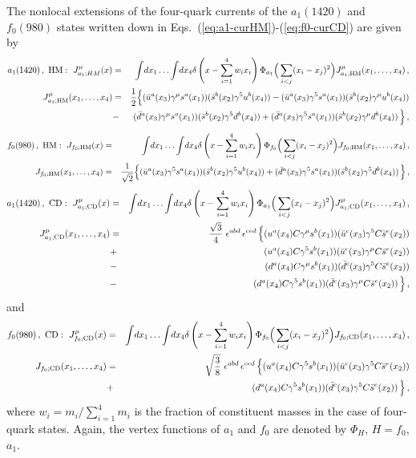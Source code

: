 \documentclass[aps,prd,floatfix,superscriptaddress,showpacs,showkeys]{revtex4}
\newcommand{\bea}{\begin{eqnarray}}
\newcommand{\ena}{\end{eqnarray}}
\begin{document}
The nonlocal extensions of the four-quark currents 
of the $a_1(1420)$ and $f_0(980)$ states written down in  
Eqs.~(\ref{eq:a1-curHM})-(\ref{eq:f0-curCD}) are given by 
%
\bea 
a_1(1420)\,, \ {\rm HM}: \ J^\mu_{a_1;HM}(x) &=& \int\! dx_1\ldots \int\! dx_4 
\delta\left(x-\sum\limits_{i=1}^4 w_i x_i\right) 
\Phi_{a_1}\Big(\sum\limits_{i<j} (x_i-x_j)^2 \Big)
J^\mu_{a_1;{\rm HM}}(x_1,\ldots,x_4)\,,
\label{eq:nonlocal-mol-cura1}\\
J^\mu_{a_1;{\rm HM}}(x_1,\ldots,x_4) &=&  \frac{1}{2} 
\Big\{
  (\bar u^a(x_3) \gamma^\mu s^a(x_1))  (\bar s^b(x_2) \gamma^5   u^b(x_4) )
- (\bar u^a(x_3) \gamma^5   s^a(x_1))  (\bar s^b(x_2) \gamma^\mu u^b(x_4) )
\nonumber\\
&-& (\bar d^a(x_3) \gamma^\mu s^a(x_1))  (\bar s^b(x_2) \gamma^5   d^b(x_4) )
  + (\bar d^a(x_3) \gamma^5   s^a(x_1))  (\bar s^b(x_2) \gamma^\mu d^b(x_4) )
\,\Big\}\,,
\nonumber
\ena 
\bea
f_0(980)\,, \ {\rm HM}: \ J_{f_0;{\rm HM}}(x) &=& \int\! dx_1\ldots \int\! dx_4 
\delta\left(x-\sum\limits_{i=1}^4 w_i x_i\right) 
\Phi_{f_0}\Big(\sum\limits_{i<j} (x_i-x_j)^2 \Big)
J_{f_0;{\rm HM}}(x_1,\ldots,x_4)\,,
\label{eq:nonlocal-mol-curf0}\\
J_{f_0;{\rm HM}}(x_1,\ldots,x_4) &=&  \frac{1}{\sqrt{2}} 
\Big\{
  (\bar u^a(x_3) \gamma^5 s^a(x_1))  (\bar s^b(x_2) \gamma^5 u^b(x_4) )
+ (\bar d^a(x_3) \gamma^5 s^a(x_1))  (\bar s^b(x_2) \gamma^5 d^b(x_4) )
\,\Big\}\,,
\nonumber
\ena 
\bea 
a_1(1420)\,, \ {\rm CD}: \ J^\mu_{a_1;{\rm CD}}(x) &=& 
\int\! dx_1\ldots \int\! dx_4 
\delta\left(x-\sum\limits_{i=1}^4 w_i x_i\right) 
\Phi_{a_1}\Big(\sum\limits_{i<j} (x_i-x_j)^2 \Big)
J^\mu_{a_1;{\rm CD}}(x_1,\ldots,x_4)\,,
\label{eq:nonlocal-cd-cura1}\\
J^\mu_{a_1;{\rm CD}}(x_1,\ldots,x_4)  
&=&  \frac{\sqrt{3}}{4} \ \epsilon^{abd} \, \epsilon^{ced} \,  
\Big\{
     (u^a(x_4) C \gamma^\mu s^b(x_1))  (\bar u^c(x_3) \gamma^5   C \bar s^e(x_2) )
\nonumber\\
 &+& (u^a(x_4) C \gamma^5   s^b(x_1))  (\bar u^c(x_3) \gamma^\mu C \bar s^e(x_2) )
\nonumber\\
 &-& (d^a(x_4) C \gamma^\mu s^b(x_1))  (\bar d^c(x_3) \gamma^5   C \bar s^e(x_2) )
\nonumber\\
 &-& (d^a(x_4) C \gamma^5   s^b(x_1))  (\bar d^c(x_3) \gamma^\mu C \bar s^e(x_2) )
\,\Big\}\,,
\nonumber
\ena 
and 
\bea 
f_0(980)\,, \ {\rm CD}: \ J^\mu_{f_0;{\rm CD}}(x) &=& 
\int\! dx_1\ldots \int\! dx_4 
\delta\left(x-\sum\limits_{i=1}^4 w_i x_i\right) 
\Phi_{f_0}\Big(\sum\limits_{i<j} (x_i-x_j)^2 \Big)
J_{f_0;{\rm CD}}(x_1,\ldots,x_4)\,,
\label{eq:nonlocal-cd-curf0}\\
J_{f_0;{\rm CD}}(x_1,\ldots,x_4) 
&=&  \sqrt{\frac{3}{8}} \ \epsilon^{abd} \, \epsilon^{ced} \,  
\Big\{
       (u^a(x_4) C \gamma^5 s^b(x_1))  (\bar u^c(x_3) \gamma^5   C \bar s^e(x_2) )
\nonumber\\
   &+& (d^a(x_4) C \gamma^5 s^b(x_1))  (\bar d^c(x_3) \gamma^5 C \bar s^e(x_2) )
\,\Big\}\,, 
\nonumber
\ena 
where $w_i = m_i/\sum\limits_{i=1}^4 m_i$ is the fraction of constituent
masses in the case of
four-quark states. Again, the vertex functions of $a_1$ and $f_0$ are denoted
by  $\Phi_H$, $H = f_0$, $a_1$.
\end{document}
